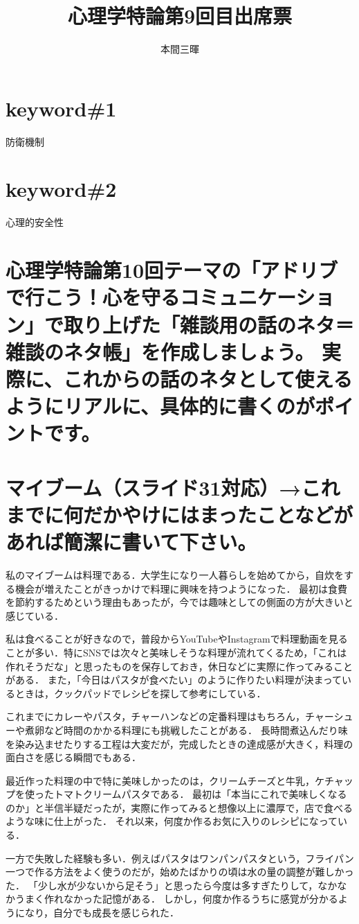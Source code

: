 \documentclass[titlepage,a4paper]{jsarticle}
\title{心理学特論第9回目出席票}
\author{本間三暉}
\begin{document}
\maketitle
\section*{keyword\#1}
防衛機制
\section*{keyword\#2}
心理的安全性

\section*{心理学特論第10回テーマの「アドリブで行こう！心を守るコミュニケーション」で取り上げた「雑談用の話のネタ＝雑談のネタ帳」を作成しましょう。
実際に、これからの話のネタとして使えるようにリアルに、具体的に書くのがポイントです。}
\section{マイブーム（スライド31対応）→これまでに何だかやけにはまったことなどがあれば簡潔に書いて下さい。}
私のマイブームは料理である．大学生になり一人暮らしを始めてから，自炊をする機会が増えたことがきっかけで料理に興味を持つようになった．
最初は食費を節約するためという理由もあったが，今では趣味としての側面の方が大きいと感じている．

私は食べることが好きなので，普段からYouTubeやInstagramで料理動画を見ることが多い．特にSNSでは次々と美味しそうな料理が流れてくるため，「これは作れそうだな」と思ったものを保存しておき，休日などに実際に作ってみることがある．
また，「今日はパスタが食べたい」のように作りたい料理が決まっているときは，クックパッドでレシピを探して参考にしている．

これまでにカレーやパスタ，チャーハンなどの定番料理はもちろん，チャーシューや煮卵など時間のかかる料理にも挑戦したことがある．
長時間煮込んだり味を染み込ませたりする工程は大変だが，完成したときの達成感が大きく，料理の面白さを感じる瞬間でもある．

最近作った料理の中で特に美味しかったのは，クリームチーズと牛乳，ケチャップを使ったトマトクリームパスタである．
最初は「本当にこれで美味しくなるのか」と半信半疑だったが，実際に作ってみると想像以上に濃厚で，店で食べるような味に仕上がった．
それ以来，何度か作るお気に入りのレシピになっている．

一方で失敗した経験も多い．例えばパスタはワンパンパスタという，フライパン一つで作る方法をよく使うのだが，始めたばかりの頃は水の量の調整が難しかった．
「少し水が少ないから足そう」と思ったら今度は多すぎたりして，なかなかうまく作れなかった記憶がある．
しかし，何度か作るうちに感覚が分かるようになり，自分でも成長を感じられた．
\end{document}
